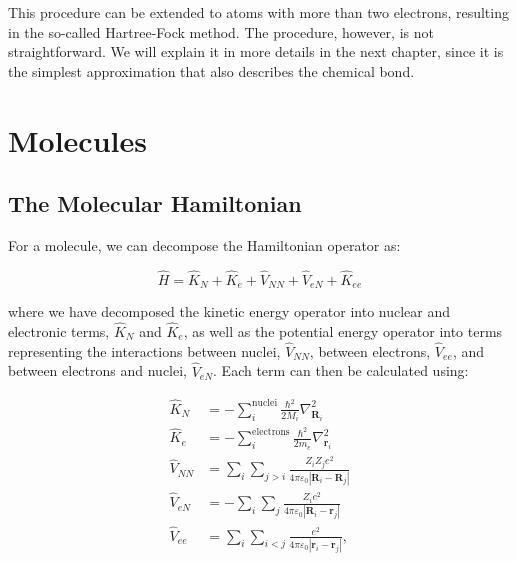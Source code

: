 \documentclass[
  9pt,
]{extbook}
\theoremstyle{definition}
\theoremstyle{definition}
\theoremstyle{definition}
\theoremstyle{remark}
\begin{document}
This procedure can be extended to atoms with more than two electrons, resulting in the so-called Hartree-Fock method. The procedure, however, is not straightforward. We will explain it in more details in the next chapter, since it is the simplest approximation that also describes the chemical bond.

\hypertarget{Molecules}{%
\chapter{Molecules}\label{Molecules}}

\hypertarget{the-molecular-hamiltonian}{%
\section{The Molecular Hamiltonian}\label{the-molecular-hamiltonian}}

For a molecule, we can decompose the Hamiltonian operator as:

\begin{equation}
\hat{H} = \hat{K}_N +\hat{K}_{e} + \hat{V}_{NN} + \hat{V}_{eN} + \hat{K}_{ee}
\label{eq:molham1}
\end{equation}

where we have decomposed the kinetic energy operator into nuclear and electronic terms, \(\hat{K}_N\) and \(\hat{K}_e\), as well as the potential energy operator into terms representing the interactions between nuclei, \(\hat{V}_{NN}\), between electrons, \(\hat{V}_{ee}\), and between electrons and nuclei, \(\hat{V}_{eN}\). Each term can then be calculated using:

\begin{equation}
\begin{aligned}
\hat{K}_{N} &=-\sum_{i}^{\text{nuclei}}{\frac  {\hbar ^{2}}{2M_{i}}}\nabla_{{{\mathbf  {R}}_{i}}}^{2} \\
\hat  {K}_{e} &=-\sum_{i}^{\text{electrons}}{\frac  {\hbar ^{2}}{2m_{e}}}\nabla _{{{\mathbf{r}}_{i}}}^{2} \\
\hat{V}_{{NN}} &= \sum _{i}\sum _{{j>i}}{\frac  {Z_{i}Z_{j}e^{2}}{4\pi \varepsilon _{0}\left|{\mathbf  {R}}_{i}-{\mathbf  {R}}_{j}\right|}} \\
\hat  {V}_{{eN}} &=-\sum _{i}\sum _{j}{\frac  {Z_{i}e^{2}}{4\pi \varepsilon_{0}\left|{\mathbf  {R}}_{i}-{\mathbf  {r}}_{j}\right|}} \\
\hat{V}_{{ee}} &= \sum _{i}\sum _{{i<j}}{\frac  {e^{2}}{4\pi \varepsilon _{0}\left|{\mathbf  {r}}_{i}-{\mathbf  {r}}_{j}\right|}},
\end{aligned}
\label{eq:molham2}
\end{equation}
\end{document}
